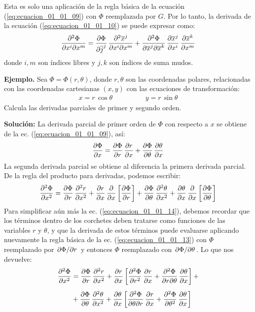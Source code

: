\documentclass[hidelinks,12pt]{article}
\begin{document}
Esta es solo una aplicación de la regla básica de la ecuación (\ref{eq:ecuacion_01_01_09}) con $\Phi$ reemplazada por $G$. Por lo tanto, la derivada de la ecuación (\ref{eq:ecuacion_01_01_10}) se puede expresar como:
\begin{align}
\pdv[2]{\Phi}{x^{i}}{x^{m}} = \pdv{\Phi}{\overline{j}^{j}} \, \pdv[2]{\overline{x}^{j}}{x^{i}}{x^{m}} + \pdv[2]{\Phi}{\overline{x}^{j}}{\overline{x}^{k}} \, \pdv{\overline{x}^{j}}{x^{i}} \, \pdv{\overline{x}^{k}}{x^{m}}
\label{eq:ecuacion_01_01_12}
\end{align}
donde $i, m$ son índices libres y $j, k$ son índices de suma mudos.
\par
\noindent
\textbf{Ejemplo. } Sea $\Phi = \Phi (r, \theta)$, donde $r, \theta$ son las coordenadas polares, relacionadas con las coordenadas cartesianas $(x, y)$ con las ecuaciones de transformación:
\begin{align*}
x =  r \, \cos \theta \hspace{2cm} y = r \, \sin \theta
\end{align*}
Calcula las derivadas parciales de primer y segundo orden.
\par
\noindent
\textbf{Solución:} La derivada parcial de primer orden de $\Phi$ con respecto a $x$ se obtiene de la ec. (\ref{eq:ecuacion_01_01_09}), así:
\begin{align}
\pdv{\Phi}{x} = \pdv{\Phi}{r} \, \pdv{r}{x} + \pdv{\Phi}{\theta} \, \pdv{\theta}{x}
\label{eq:ecuacion_01_01_13}
\end{align}
La segunda derivada parcial se obtiene al diferencia la primera derivada parcial. De la regla del producto para derivadas, podemos escribir:
\begin{align}
\pdv[2]{\Phi}{x} = \pdv{\Phi}{r} \, \pdv[2]{r}{x} + \pdv{r}{x} \, \pdv{x} \left[ \pdv{\Phi}{r} \right] + \pdv{\Phi}{\theta} \, \pdv[2]{\theta}{x} + \pdv{\theta}{x} \, \pdv{x} \left[ \pdv{\Phi}{\theta} \right]
\label{eq:ecuacion_01_01_14}
\end{align}
Para simplificar aún más la ec. (\ref{eq:ecuacion_01_01_14}), debemos recordar que los términos dentro de los corchetes deben tratarse como funciones de las variables $r$ y $\theta$, y que la derivada de estos términos puede evaluarse aplicando nuevamente la regla básica de la ec. (\ref{eq:ecuacion_01_01_13}) con $\Phi$ reemplazado por $\pdv*{\Phi}{r}$ y entonces $\Phi$ reemplazado con $\pdv*{\Phi}{\theta}$. Lo que nos devuelve:
\begin{align}
\begin{aligned}[b]
\pdv[2]{\Phi}{x} &= \pdv{\Phi}{r} \, \pdv[2]{r}{x} + \pdv{r}{x} \left[ \pdv[2]{\Phi}{r} \, \pdv{r}{x} + \pdv[2]{\Phi}{r}{\theta} \, \pdv{\theta}{x} \right] + \\[0.5em]
&+ \pdv{\Phi}{\theta} \, \pdv[2]{\theta}{x} + \pdv{\theta}{x} \left[ \pdv[2]{\Phi}{\theta}{r} \, \pdv{r}{x} + \pdv[2]{\Phi}{\theta} \, \pdv{\theta}{x} \right]
\end{aligned}
\label{eq:ecuacion_01_01_15}
\end{align}
\end{document}
